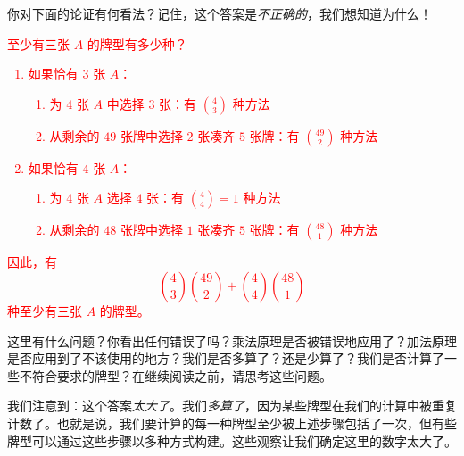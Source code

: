 你对下面的论证有何看法？记住，这个答案是\emph{不正确的}，我们想知道为什么！\\

\begin{example}[找出缺陷]

    \textcolor{red}{
        至少有三张 $A$ 的牌型有多少种？
        \begin{enumerate}[label=(\arabic*)]
            \item 如果恰有 $3$ 张 $A$：
                  \begin{enumerate}[label=(\alph*)]
                      \item 为 $4$ 张 $A$ 中选择 $3$ 张：有 ${4 \choose 3}$ 种方法
                      \item 从剩余的 $49$ 张牌中选择 $2$ 张凑齐 $5$ 张牌：有 ${49 \choose 2}$ 种方法
                  \end{enumerate}
            \item 如果恰有 $4$ 张 $A$：
                  \begin{enumerate}[label=(\alph*)]
                      \item 为 $4$ 张 $A$ 选择 $4$ 张：有 ${4 \choose 4} = 1$ 种方法
                      \item 从剩余的 $48$ 张牌中选择 $1$ 张凑齐 $5$ 张牌：有 ${48 \choose 1}$ 种方法
                  \end{enumerate}
        \end{enumerate}
        因此，有
        \[{4 \choose 3}{49 \choose 2}+{4 \choose 4}{48 \choose 1}\]
        种至少有三张 $A$ 的牌型。
    }

    这里有什么问题？你看出任何错误了吗？乘法原理是否被错误地应用了？加法原理是否应用到了不该使用的地方？我们是否多算了？还是少算了？我们是否计算了一些不符合要求的牌型？在继续阅读之前，请思考这些问题。

    我们注意到：这个答案\emph{太大了}。我们\emph{多算了}，因为某些牌型在我们的计算中被重复计数了。也就是说，我们要计算的每一种牌型至少被上述步骤包括了一次，但有些牌型可以通过这些步骤以多种方式构建。这些观察让我们确定这里的数字太大了。


\end{example}
